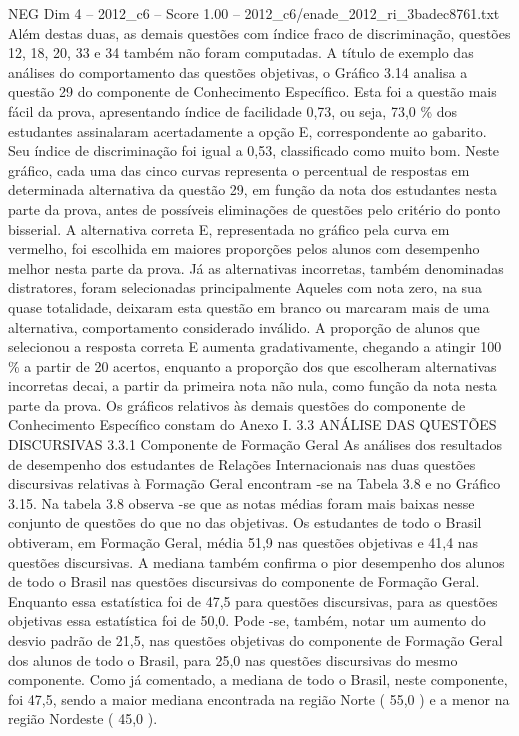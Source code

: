 \begin{textsample}{NEG Dim 4 – 2012\_c6 – Score 1.00 – 2012\_c6/enade\_2012\_ri\_3badec8761.txt}
Além destas duas, as demais questões com índice fraco de discriminação, questões 12, 18, 20, 33 e 34 também não foram computadas.
A título de exemplo das análises do comportamento das questões objetivas, o Gráfico 3.14 analisa a questão 29 do componente de Conhecimento Específico.
Esta foi a questão mais fácil da prova, apresentando índice de facilidade 0,73, ou seja, 73,0 \% dos estudantes assinalaram acertadamente a opção E, correspondente ao gabarito.
Seu índice de discriminação foi igual a 0,53, classificado como muito bom.
Neste gráfico, cada uma das cinco curvas representa o percentual de respostas em determinada alternativa da questão 29, em função da nota dos estudantes nesta parte da prova, antes de possíveis eliminações de questões pelo critério do ponto bisserial.
A alternativa correta E, representada no gráfico pela curva em vermelho, foi escolhida em maiores proporções pelos alunos com desempenho melhor nesta parte da prova.
Já as alternativas incorretas, também denominadas distratores, foram selecionadas principalmente Aqueles com nota zero, na sua quase totalidade, deixaram esta questão em branco ou marcaram mais de uma alternativa, comportamento considerado inválido.
A proporção de alunos que selecionou a resposta correta E aumenta gradativamente, chegando a atingir 100 \% a partir de 20 acertos, enquanto a proporção dos que escolheram alternativas incorretas decai, a partir da primeira nota não nula, como função da nota nesta parte da prova.
Os gráficos relativos às demais questões do componente de Conhecimento Específico constam do Anexo I. 3.3 ANÁLISE DAS QUESTÕES DISCURSIVAS 3.3.1 Componente de Formação Geral As análises dos resultados de desempenho dos estudantes de Relações Internacionais nas duas questões discursivas relativas à Formação Geral encontram -se na Tabela 3.8 e no Gráfico 3.15.
Na tabela 3.8 observa -se que as notas médias foram mais baixas nesse conjunto de questões do que no das objetivas.
Os estudantes de todo o Brasil obtiveram, em Formação Geral, média 51,9 nas questões objetivas e 41,4 nas questões discursivas.
A mediana também confirma o pior desempenho dos alunos de todo o Brasil nas questões discursivas do componente de Formação Geral.
Enquanto essa estatística foi de 47,5 para questões discursivas, para as questões objetivas essa estatística foi de 50,0.
Pode -se, também, notar um aumento do desvio padrão de 21,5, nas questões objetivas do componente de Formação Geral dos alunos de todo o Brasil, para 25,0 nas questões discursivas do mesmo componente.
Como já comentado, a mediana de todo o Brasil, neste componente, foi 47,5, sendo a maior mediana encontrada na região Norte ( 55,0 ) e a menor na região Nordeste ( 45,0 ).

\end{textsample}

